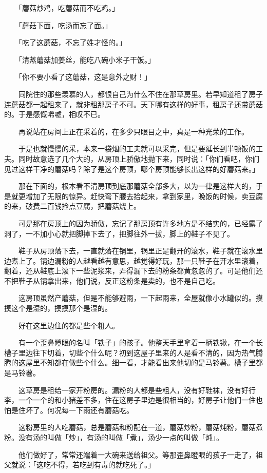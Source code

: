 \documentclass[UTF8]{ctexart}
\begin{document}
　　「蘑菇炒鸡，吃蘑菇而不吃鸡。」

　　「蘑菇下面，吃汤而忘了面。」

　　「吃了这蘑菇，不忘了姓才怪的。」

　　「清蒸蘑菇加姜丝，能吃八碗小米子干饭。」

　　「你不要小看了这蘑菇，这是意外之财！」

　　同院住的那些羡慕的人，都恨自己为什么不住在那草房里。若早知道租了房子连蘑菇都一起租来了，就非租那房子不可。天下哪有这样的好事，租房子还带蘑菇的。于是感慨唏嘘，相叹不已。

　　再说站在房间上正在采着的，在多少只眼目之中，真是一种光荣的工作。

　　于是也就慢慢的采，本来一袋烟的工夫就可以采完，但是要延长到半顿饭的工夫。同时故意选了几个大的，从房顶上骄傲地抛下来，同时说：「你们看吧，你们见过这样干净的蘑菇吗？除了是这个房顶，哪个房顶能够长出这样的好蘑菇来。」

　　那在下面的，根本看不清房顶到底那蘑菇全部多大，以为一律是这样大的，于是就更增加了无限的惊异。赶快弯下腰去拾起来，拿到家里，晚饭的时候，卖豆腐的来，破费二百钱捡点豆腐，把蘑菇烧上。

　　可是那在房顶上的因为骄傲，忘记了那房顶有许多地方是不结实的，已经露了洞了，一不加小心就把脚掉下去了，把脚往外一拔，脚上的鞋子不见了。

　　鞋子从房顶落下去，一直就落在锅里，锅里正是翻开的滚水，鞋子就在滚水里边煮上了。锅边漏粉的人越看越有意思，越觉得好玩，那一只鞋子在开水里滚着，翻着，还从鞋底上滚下一些泥浆来，弄得漏下去的粉条都黄忽忽的了。可是他们还不把鞋子从锅拿出来，他们说，反正这粉条是卖的，也不是自己吃。

　　这房顶虽然产蘑菇，但是不能够避雨，一下起雨来，全屋就像小水罐似的。摸摸这个是湿的，摸摸那个是湿的。

　　好在这里边住的都是些个粗人。

　　有一个歪鼻瞪眼的名叫「铁子」的孩子。他整天手里拿着一柄铁锹，在一个长槽子里边往下切着，切些个什么呢？初到这屋子里来的人是看不清的，因为热气腾腾的这屋里不知都在做些个什么。细一看，才能看出来他切的是马铃薯。槽子里都是马铃薯。

　　这草房是租给一家开粉房的。漏粉的人都是些粗人，没有好鞋袜，没有好行李，一个一个的和小猪差不多，住在这房子里边是很相当的，好房子让他们一住也怕是住坏了。何况每一下雨还有蘑菇吃。

　　这粉房里的人吃蘑菇，总是蘑菇和粉配在一道，蘑菇炒粉，蘑菇炖粉，蘑菇煮粉。没有汤的叫做「炒」，有汤的叫做「煮」，汤少一点的叫做「炖」。

　　他们做好了，常常还端着一大碗来送给祖父。等那歪鼻瞪眼的孩子一走了，祖父就说：「这吃不得，若吃到有毒的就吃死了。」
\end{document}
